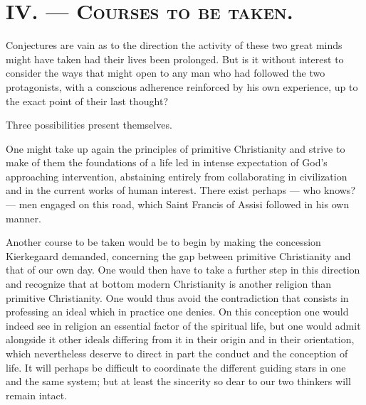 \documentclass[12pt,a4paper]{article}
\newcommand{\opage}[1]{\marginnote{\footnotesize\textit{[#1]}}}
\begin{document}
\section*{IV. --- \textsc{Courses to be taken.}}

Conjectures are vain as to the direction the activity of these two great minds
might have taken had their lives been prolonged. But is it without interest to
consider the ways that might open to any man who had followed the two
protagonists, with a conscious adherence reinforced by his own experience, up to
the exact point of their last thought?

Three possibilities present themselves.

One might take up again the principles of primitive Christianity and strive to
make of them the foundations of a life led in intense expectation of God's
approaching intervention, abstaining entirely from collaborating in civilization
and in the current works of human interest. There exist perhaps --- who knows?
--- men engaged on this road, which Saint Francis of Assisi followed in his own
manner.

Another course to be taken would be to begin by making the concession Kierkegaard
demanded, concerning the gap between primitive Christianity and that of our own
day. One would then have to take a further step in this direction and recognize
that at bottom modern Christianity is another religion than primitive
Christianity. One would thus avoid the contradiction that consists in professing
an ideal which in practice one denies. On this conception one would indeed see
in religion an essential factor of the spiritual life, but one would \opage{243}admit
alongside it other ideals differing from it in their origin and in their
orientation, which nevertheless deserve to direct in part the conduct and the
conception of life. It will perhaps be difficult to coordinate the different
guiding stars in one and the same system; but at least the sincerity so dear to
our two thinkers will remain intact.
\end{document}

